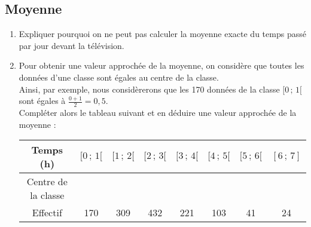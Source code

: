 \sautpage

\subsection{Moyenne}
\begin{enumerate}
	\item Expliquer pourquoi on ne peut pas calculer la moyenne exacte du temps passé par jour devant la télévision.
	\item Pour obtenir une valeur approchée de la moyenne, on considère que toutes les données d'une classe sont
égales au centre de la classe.\\
Ainsi, par exemple, nous considèrerons que les 170 données de la classe $[0\, ;\, 1[$ sont égales à $\frac{0+1}{2}=0,5$.\\
Compléter alors le tableau suivant et en déduire une valeur approchée de la moyenne :
\begin{center}
\begin{tabular}{|*{8}{c|}}
\hline
Temps (h) & $[0\, ;\, 1[$ &$[1 \, ;\, 2[$ &$[2 \, ;\, 3[$ &$[3 \, ;\, 4[$ &$[4 \, ;\, 5[$& $[5 \, ;\, 6[$ &$[6 \, ;\, 7]$\\ \hline
Centre de la
classe & & & & & & & \\ \hline
Effectif& 170& 309& 432& 221& 103& 41& 24\\ \hline
\end{tabular}
\end{center}
\end{enumerate}

